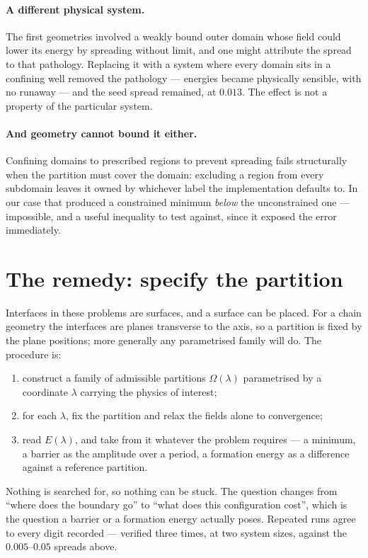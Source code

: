 \documentclass[11pt]{article}
\begin{document}
\paragraph{A different physical system.} The first geometries involved a weakly bound outer domain
whose field could lower its energy by spreading without limit, and one might attribute the spread to
that pathology. Replacing it with a system where every domain sits in a confining well removed the
pathology --- energies became physically sensible, with no runaway --- and the seed spread remained,
at $0.013$. The effect is not a property of the particular system.

\paragraph{And geometry cannot bound it either.} Confining domains to prescribed regions to prevent
spreading fails structurally when the partition must cover the domain: excluding a region from every
subdomain leaves it owned by whichever label the implementation defaults to. In our case that
produced a constrained minimum \emph{below} the unconstrained one --- impossible, and a useful
inequality to test against, since it exposed the error immediately.

\section{The remedy: specify the partition}

Interfaces in these problems are surfaces, and a surface can be placed. For a chain geometry the
interfaces are planes transverse to the axis, so a partition is fixed by the plane positions; more
generally any parametrised family will do. The procedure is:

\begin{enumerate}\itemsep2pt
\item construct a family of admissible partitions $\Omega(\lambda)$ parametrised by a coordinate
$\lambda$ carrying the physics of interest;
\item for each $\lambda$, fix the partition and relax the fields alone to convergence;
\item read $E(\lambda)$, and take from it whatever the problem requires --- a minimum, a barrier as
the amplitude over a period, a formation energy as a difference against a reference partition.
\end{enumerate}

Nothing is searched for, so nothing can be stuck. The question changes from ``where does the
boundary go'' to ``what does this configuration cost'', which is the question a barrier or a
formation energy actually poses. Repeated runs agree to every digit recorded --- verified three
times, at two system sizes, against the $0.005$--$0.05$ spreads above.
\end{document}
